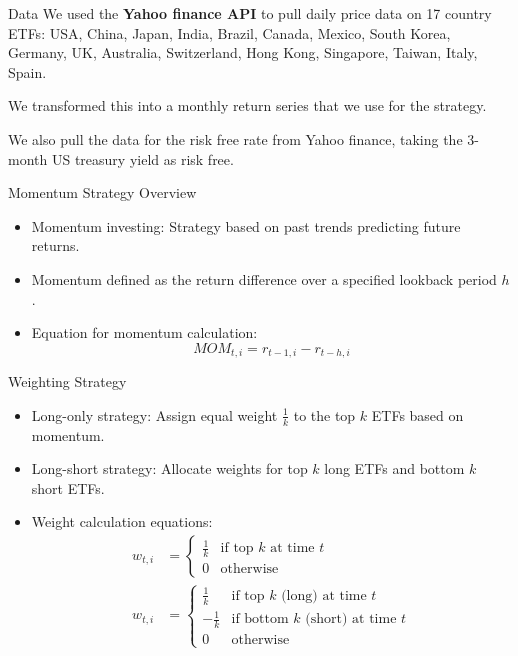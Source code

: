 \documentclass{beamer}
\begin{document}
\begin{frame}[t]{Data}
We used the \textbf{Yahoo finance API} to pull daily price data on 17 country ETFs: USA, China, Japan, India, Brazil, Canada, Mexico, South Korea, Germany, UK, Australia, Switzerland, Hong Kong, Singapore, Taiwan, Italy, Spain. 

We transformed this into a monthly return series that we use for the strategy.

We also pull the data for the risk free rate from Yahoo finance, taking the 3-month US treasury yield as risk free.
\end{frame}

\begin{frame}[t]{Momentum Strategy Overview}
    \begin{itemize}
        \item Momentum investing: Strategy based on past trends predicting future returns.
        \item Momentum defined as the return difference over a specified lookback period $h$.
        \item Equation for momentum calculation:
        \begin{equation}
            MOM_{t,i} = r_{t-1,i} - r_{t-h,i}
        \end{equation}
    \end{itemize}
\end{frame}

\begin{frame}[t]{Weighting Strategy}
    \begin{itemize}
        \item Long-only strategy: Assign equal weight $\frac{1}{k}$ to the top $k$ ETFs based on momentum.
        \item Long-short strategy: Allocate weights for top $k$ long ETFs and bottom $k$ short ETFs.
        \item Weight calculation equations:
        \begin{align}
            w_{t,i} &= \begin{cases} 
            \frac{1}{k} & \text{if top } k \text{ at time } t \\
            0           & \text{otherwise}
            \end{cases} \\
            w_{t,i} &= \begin{cases} 
            \frac{1}{k}  & \text{if top } k \text{ (long) at time } t \\
            -\frac{1}{k} & \text{if bottom } k \text{ (short) at time } t \\
            0            & \text{otherwise}
            \end{cases}
        \end{align}
    \end{itemize}
\end{frame}
\end{document}
